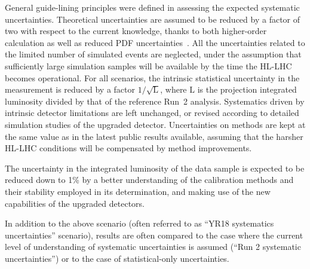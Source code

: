 General guide-lining principles were defined in assessing the expected systematic uncertainties.
Theoretical uncertainties are assumed to be reduced by a factor of two with respect to the current knowledge, thanks to both
higher-order calculation as well as reduced PDF uncertainties~\cite{Khalek:2018mdn}.
All the uncertainties related to the limited number of simulated events are neglected, under the assumption that sufficiently large simulation samples will be available by the time the HL-LHC becomes operational. For all scenarios, the intrinsic statistical uncertainty in the measurement is reduced by a factor $1/\sqrt{\text{L}}$, where $\text{L}$ is the projection integrated luminosity divided by that of the reference Run~2 analysis.
Systematics driven by intrinsic detector limitations are left unchanged, or revised according to detailed simulation studies of the upgraded detector.
Uncertainties on methods are kept at the same value as in the latest public results available, assuming that the harsher HL-LHC conditions will be compensated by method improvements.


The uncertainty in the integrated luminosity of the data sample is expected to be reduced down to 1\% by a better understanding of the calibration methods and
their stability employed in its determination, and making use of the new capabilities of the upgraded detectors.

In addition to the above scenario (often referred to as ``YR18 systematics uncertainties'' scenario), results are often
compared to the case where the current level of understanding of systematic uncertainties is assumed (``Run 2 systematic uncertainties'')
or to the case of statistical-only uncertainties.


\clearpage



